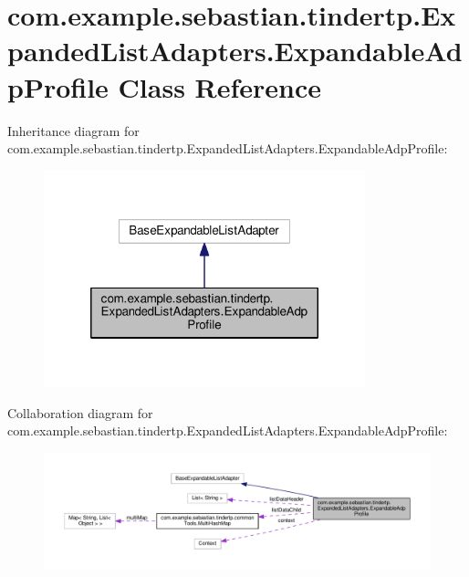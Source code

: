 \hypertarget{classcom_1_1example_1_1sebastian_1_1tindertp_1_1ExpandedListAdapters_1_1ExpandableAdpProfile}{}\section{com.\+example.\+sebastian.\+tindertp.\+Expanded\+List\+Adapters.\+Expandable\+Adp\+Profile Class Reference}
\label{classcom_1_1example_1_1sebastian_1_1tindertp_1_1ExpandedListAdapters_1_1ExpandableAdpProfile}


Inheritance diagram for com.\+example.\+sebastian.\+tindertp.\+Expanded\+List\+Adapters.\+Expandable\+Adp\+Profile\+:
\nopagebreak
\begin{figure}[H]
\begin{center}
\leavevmode
\includegraphics[width=264pt]{classcom_1_1example_1_1sebastian_1_1tindertp_1_1ExpandedListAdapters_1_1ExpandableAdpProfile__inherit__graph}
\end{center}
\end{figure}


Collaboration diagram for com.\+example.\+sebastian.\+tindertp.\+Expanded\+List\+Adapters.\+Expandable\+Adp\+Profile\+:
\nopagebreak
\begin{figure}[H]
\begin{center}
\leavevmode
\includegraphics[width=350pt]{classcom_1_1example_1_1sebastian_1_1tindertp_1_1ExpandedListAdapters_1_1ExpandableAdpProfile__coll__graph}
\end{center}
\end{figure}
